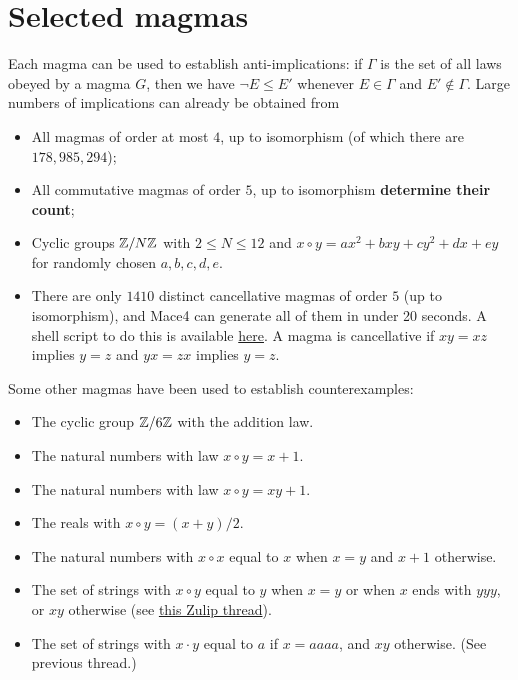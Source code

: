 \chapter{Selected magmas}

Each magma can be used to establish anti-implications: if $\Gamma$ is the set of all laws obeyed by a magma $G$, then we have $\neg E \leq E'$ whenever $E \in \Gamma$ and $E' \not \in \Gamma$.  Large numbers of implications can already be obtained from

\begin{itemize}
  \item All magmas of order at most $4$, up to isomorphism (of which there are $178,985,294$);
  \item All commutative magmas of order $5$, up to isomorphism {\bf determine their count};
  \item Cyclic groups $\mathbb{Z}/N\mathbb{Z}$ with $2 \leq N \leq 12$ and $x \circ y = ax^2+bxy+cy^2+dx+ey$ for randomly chosen $a,b,c,d,e$.
  \item There are only $1410$ distinct cancellative magmas of order $5$ (up to isomorphism), and Mace4 can generate all of them in under 20 seconds. A shell script to do this is available \href{https://github.com/zaklogician/equational_theories/tree/cancellative_magmas/scripts/cancellative_magmas}{here}. A magma is cancellative if $xy=xz$ implies $y=z$ and $yx=zx$ implies $y=z$.
\end{itemize}


Some other magmas have been used to establish counterexamples:
\begin{itemize}
  \item The cyclic group $\mathbb{Z}/6\mathbb{Z}$ with the addition law.
  \item The natural numbers with law $x \circ y = x+1$.
  \item The natural numbers with law $x \circ y = xy+1$.
  \item The reals with $x \circ y = (x+y)/2$.
  \item The natural numbers with $x \circ x$ equal to $x$ when $x=y$ and $x+1$ otherwise.
  \item The set of strings with $x \circ y$ equal to $y$ when $x=y$ or when $x$ ends with $yyy$, or $xy$ otherwise (see \href{https://leanprover.zulipchat.com/#narrow/stream/458659-Equational/topic/3102.20does.20not.20imply.203176}{this Zulip thread}).
  \item The set of strings with $x \cdot y$ equal to $a$ if $x=aaaa$, and $xy$ otherwise.  (See previous thread.)
\end{itemize}
